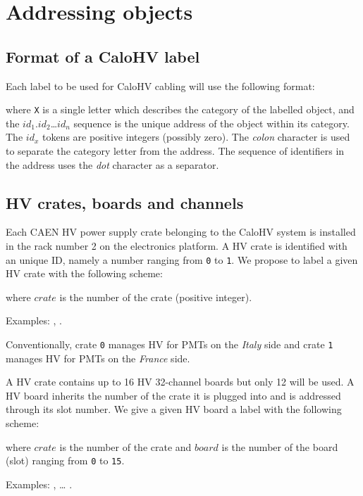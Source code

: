 
\section{Addressing objects}

\subsection{Format of a CaloHV label}

Each label to be used for CaloHV cabling will use the following format:

\begin{center}
\end{center}
\noindent  where \texttt{X}  is a  single letter  which describes  the
category  of the  labelled  object,  and the  $id_1$.$id_2$\dots$id_n$
sequence is the unique address of the object within its category.  The
$id_x$ tokens are positive integers (possibly zero).  The \emph{colon}
character is  used to separate  the category letter from  the address.
The  sequence  of  identifiers  in  the  address  uses  the  \emph{dot}
character as a separator.


\subsection{HV crates, boards and channels}

Each CAEN HV power supply crate belonging to the CaloHV system is installed
in the rack number 2 on the electronics platform.
A HV crate is identified with an unique ID, namely
a number ranging from \texttt{0} to \texttt{1}.  We propose to label a
given HV crate with the following scheme:
\begin{center}
 \end{center}
where \texttt{$crate$} is the number of the crate (positive integer).
\vskip     10pt    \par\noindent     Examples:    ,
.  \par Conventionally, crate \texttt{0} manages HV
for PMTs on the \emph{Italy} side  and crate \texttt{1} manages HV for
PMTs on the \emph{France} side.

\vskip 10pt A HV crate contains up to 16 HV 32-channel boards but only 12
will be  used.  A  HV board  inherits the  number of  the crate  it is
plugged into  and is addressed through  its slot number.  We give a given HV board
a label with the following scheme:
\begin{center}
 \end{center}
where \texttt{$crate$} is the number of the crate and \texttt{$board$}
is  the  number  of  the  board  (slot)  ranging  from  \texttt{0}  to
\texttt{15}.
\vskip 10pt
\par\noindent Examples: ,  \dots
{}.


